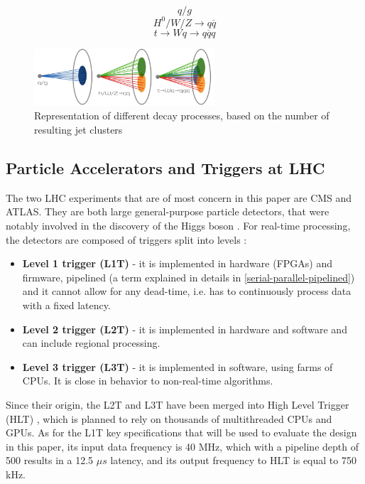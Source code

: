 \[ q / g \]
\[ H^0 / W / Z \rightarrow q\overline{q} \]
\[ t \rightarrow Wq \rightarrow q\overline{q}q \]

\begin{figure}[hpt!]
  \centering
  \includegraphics[trim={0cm 0cm 0cm 0cm}, width=0.6\textwidth, center]{background/jedi_jets.png}
  \caption{Representation of different decay processes, based on the number of resulting jet clusters}
  \label{fig:jedi-jets}
\end{figure}

\subsection{Particle Accelerators and Triggers at LHC}
The two LHC experiments that are of most concern in this paper are CMS and ATLAS. They are both large general-purpose particle detectors, that were notably involved in the discovery of the Higgs boson \cite{47-greeene2013higgs}. For real-time processing, the detectors are composed of triggers split into levels \citep[p.16]{48-trigger}:

\begin{itemize}
  \item \textbf{Level 1 trigger (L1T)} - it is implemented in hardware (FPGAs) and firmware, pipelined (a term explained in details in \autoref{serial-parallel-pipelined}) and it cannot allow for any dead-time, i.e. has to continuously process data with a fixed latency.
  \item \textbf{Level 2 trigger (L2T)} - it is implemented in hardware and software and can include regional processing.
  \item \textbf{Level 3 trigger (L3T)} - it is implemented in software, using farms of CPUs. It is close in behavior to non-real-time algorithms.
\end{itemize}

Since their origin, the L2T and L3T have been merged into High Level Trigger (HLT) \citep[p.47]{49-tappertriggering}, which is planned to rely on thousands of multithreaded CPUs and GPUs. As for the L1T key specifications that will be used to evaluate the design in this paper, its input data frequency is 40 MHz, which with a pipeline depth of 500 results in a 12.5 \(\mu s\) latency, and its output frequency to HLT is equal to 750 kHz.